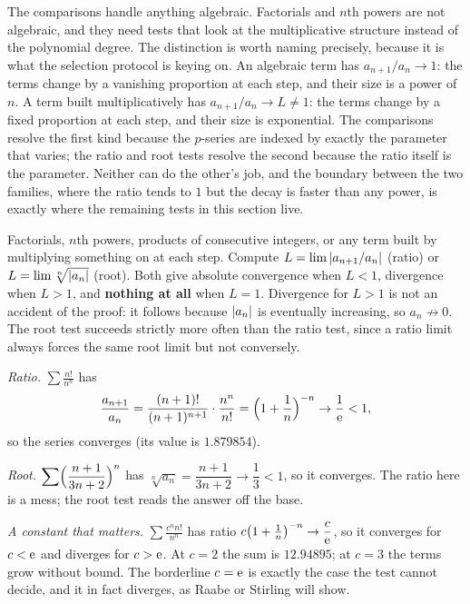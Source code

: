 The comparisons handle anything algebraic. Factorials and $n$th powers are not algebraic, and they need tests that look at the multiplicative structure instead of the polynomial degree. The distinction is worth naming precisely, because it is what the selection protocol is keying on. An algebraic term has $a_{n+1}/a_n\to1$: the terms change by a vanishing proportion at each step, and their size is a power of $n$. A term built multiplicatively has $a_{n+1}/a_n\to L\neq1$: the terms change by a fixed proportion at each step, and their size is exponential. The comparisons resolve the first kind because the $p$-series are indexed by exactly the parameter that varies; the ratio and root tests resolve the second because the ratio itself is the parameter. Neither can do the other's job, and the boundary between the two families, where the ratio tends to $1$ but the decay is faster than any power, is exactly where the remaining tests in this section live.

\cue Factorials, $n$th powers, products of consecutive integers, or any term built by multiplying something on at each step.
\method Compute $L=\lim\left\lvert a_{n+1}/a_n\right\rvert$ (ratio) or $L=\lim\sqrt[n]{\left\lvert a_n\right\rvert}$ (root). Both give absolute convergence when $L<1$, divergence when $L>1$, and \textbf{nothing at all} when $L=1$. Divergence for $L>1$ is not an accident of the proof: it follows because $\left\lvert a_n\right\rvert$ is eventually increasing, so $a_n\not\to0$. The root test succeeds strictly more often than the ratio test, since a ratio limit always forces the same root limit but not conversely.

\begin{worked}
\emph{Ratio.} $\displaystyle\sum\frac{n!}{n^n}$ has
\[\frac{a_{n+1}}{a_n}=\frac{(n+1)!}{(n+1)^{n+1}}\cdot\frac{n^n}{n!}=\Bigl(1+\frac1n\Bigr)^{-n}\to\frac1{\mathrm{e}}<1,\]
so the series converges (its value is $1.879854$).

\emph{Root.} $\displaystyle\sum\Bigl(\frac{n+1}{3n+2}\Bigr)^{n}$ has $\sqrt[n]{a_n}=\dfrac{n+1}{3n+2}\to\dfrac13<1$, so it converges. The ratio here is a mess; the root test reads the answer off the base.

\emph{A constant that matters.} $\displaystyle\sum\frac{c^{n}n!}{n^{n}}$ has ratio $c\bigl(1+\tfrac1n\bigr)^{-n}\to\dfrac{c}{\mathrm{e}}$, so it converges for $c<\mathrm{e}$ and diverges for $c>\mathrm{e}$. At $c=2$ the sum is $12.94895$; at $c=3$ the terms grow without bound. The borderline $c=\mathrm{e}$ is exactly the case the test cannot decide, and it in fact diverges, as Raabe or Stirling will show.
\end{worked}


